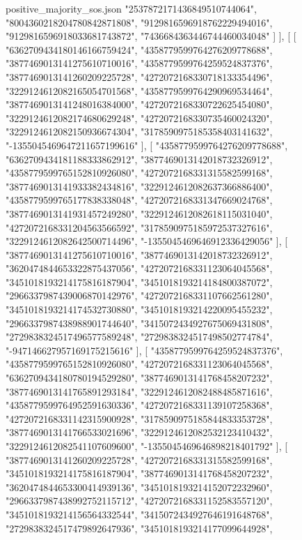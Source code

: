 \begin{filecontents*}[overwrite]{positive_majority_sos.json}
    "2537872171436849510744064",
    "8004360218204780842871808",
    "9129816596918762229494016",
    "9129816596918033681743872",
    "7436684363446744460034048"
   ]
  ],
  [
   [
    "6362709434180146166759424",
    "4358779599764276209778688",
    "3877469013141275610710016",
    "4358779599764259524837376",
    "3877469013141260209225728",
    "4272072168330718133354496",
    "3229124612082165054701568",
    "4358779599764290969534464",
    "3877469013141248016384000",
    "4272072168330722625454080",
    "3229124612082174680629248",
    "4272072168330735460024320",
    "3229124612082150936674304",
    "3178590975185358403141632",
    "-1355045469647211657199616"
   ],
   [
    "4358779599764276209778688",
    "6362709434181188333862912",
    "3877469013142018732326912",
    "4358779599765152810926080",
    "4272072168331315582599168",
    "3877469013141933382434816",
    "3229124612082637366886400",
    "4358779599765177838338048",
    "4272072168331347669024768",
    "3877469013141931457249280",
    "3229124612082618115031040",
    "4272072168331204563566592",
    "3178590975185972537327616",
    "3229124612082642500714496",
    "-1355045469646912336429056"
   ],
   [
    "3877469013141275610710016",
    "3877469013142018732326912",
    "3620474844653322875437056",
    "4272072168331123064045568",
    "3451018193214175816187904",
    "3451018193214184800387072",
    "2966337987439006870142976",
    "4272072168331107662561280",
    "3451018193214174532730880",
    "3451018193214220095455232",
    "2966337987438988901744640",
    "3415072434927675069431808",
    "2729838324517496577589248",
    "2729838324517498502774784",
    "-947146627957169175215616"
   ],
   [
    "4358779599764259524837376",
    "4358779599765152810926080",
    "4272072168331123064045568",
    "6362709434180780194529280",
    "3877469013141768458207232",
    "3877469013141765891293184",
    "3229124612082488485871616",
    "4358779599764952591630336",
    "4272072168331139107258368",
    "4272072168331142315900928",
    "3178590975185844833353728",
    "3877469013141766533021696",
    "3229124612082532123410432",
    "3229124612082541107609600",
    "-1355045469646898218401792"
   ],
   [
    "3877469013141260209225728",
    "4272072168331315582599168",
    "3451018193214175816187904",
    "3877469013141768458207232",
    "3620474844653300414939136",
    "3451018193214152072232960",
    "2966337987438992752115712",
    "4272072168331152583557120",
    "3451018193214156564332544",
    "3415072434927646191648768",
    "2729838324517479892647936",
    "3451018193214177099644928",

\end{filecontents*}
